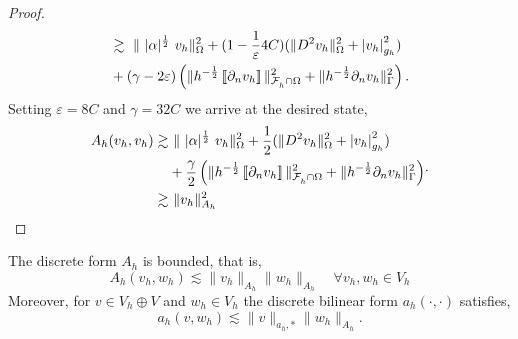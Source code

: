 \begin{proof}
\begin{equation}
\begin{split}
     & \gtrsim    \   \| \ |\alpha|^{\frac{1}{2}} \  v_{h}  \|_{   \Omega   }^{2} + (1  - \frac{1}{\varepsilon } 4C)  (\| D^2 v_{h} \|_{ \Omega  }^{ 2 }  + \left\lvert  v_{h}  \right\rvert _{ g_{h} }^{2  } )  \\
                       & + (\gamma - 2\varepsilon  )\left( \|h^{-\frac{1}{2}}  \left[\!\left[  \partial _{n} v_{h}  \right]\!\right]\|_{\mathcal{F} _{h}^{}\cap \Omega   }^{ 2 } + \| h^{-\frac{1}{2}} \partial _{n} v_{h} \|_{ \Gamma  }^{ 2} \right)        .
        \end{split}
    \end{equation}
    Setting $\varepsilon = 8C$ and $\gamma = 32C $ we arrive at the desired state,
    \begin{equation}
        \begin{split}
           A_{h}( v_{h},v_{h})  \gtrsim & \   \| \ |\alpha|^{\frac{1}{2}} \    v_{h}  \|_{  \Omega   }^{2} + \frac{1}{2}  (\| D^2 v_{h} \|_{ \Omega  }^{ 2 }  + \abs{ v_{h} } _{ g_{h} }^{2  } )  \\
                       & + \frac{\gamma }{2}\left( \|h^{-\frac{1}{2}}  \jump{ \partial _{n} v_{h} }\|_{\mathcal{F} _{h}^{}\cap \Omega   }^{ 2 } + \| h^{-\frac{1}{2}} \partial _{n} v_{h} \|_{ \Gamma  }^{ 2} \right) \\
                        \gtrsim & \  \| v_{h} \|_{ A_{h} }^{2  }
        \end{split}
.
    \end{equation}
\end{proof}


\begin{lemma}
    \label{lemma:bi_Ah_bounded}
    The discrete form $A_{h}$ is bounded, that is,
    \begin{equation}
    \label{eq:bi_A_h_bounded}
     A_{h}( v_{h},w_{h}) \lesssim \| v_{h} \|_{A_{h}  }^{  }\| w_{h} \|_{A_{h}  }^{  } \quad   \forall v_{h},w_{h} \in V_{h}
    \end{equation}
    Moreover, for $v \in V_{h} \oplus V$  and $w_{h} \in V_{h}$ the discrete bilinear form $a_{h}( \cdot ,\cdot  ) $ satisfies,
    \begin{equation}
        \label{eq:bi_a_h_bounded}
        a_{h} ( v,w_{h}) \lesssim \| v \|_{ a_{h},* }^{  } \| w_{h} \|_{ A_{h} }^{  }.
    \end{equation}
\end{lemma}

